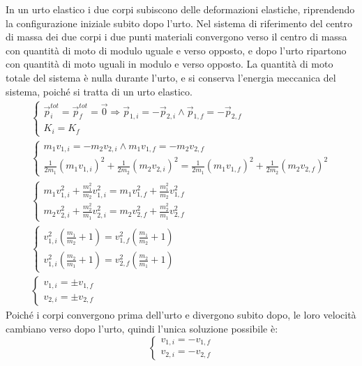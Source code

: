 \documentclass{article}
\numberwithin{equation}{subsection}
\begin{document}
In un urto elastico i due corpi subiscono delle deformazioni elastiche, riprendendo la configurazione iniziale subito dopo l'urto. 
Nel sistema di riferimento del 
centro di massa dei due corpi i due punti materiali convergono verso il centro di massa con quantità di moto di modulo uguale e verso opposto, e dopo l'urto ripartono con 
quantità di moto uguali in modulo e verso opposto. La quantità di moto 
totale del sistema è nulla durante l'urto, e si conserva l'energia meccanica del sistema, poiché si tratta di un urto elastico. 
\begin{gather*}
    \begin{cases}
        \vec{p}^{tot}_i=\vec{p}^{tot}_f=\vec{0}\Rightarrow \vec{p}_{1,i}=-\vec{p}_{2,i}\land\vec{p}_{1,f}=-\vec{p}_{2,f}\\
        K_i=K_f
    \end{cases}\\
    \begin{cases}
        m_1v_{1,i}=-m_2v_{2,i}\land m_1v_{1,f}=-m_2v_{2,f}\\
        \displaystyle\frac{1}{2m_1}(m_1v_{1,i})^2+\frac{1}{2m_2}(m_2v_{2,i})^2=\frac{1}{2m_1}(m_1v_{1,f})^2+\frac{1}{2m_2}(m_2v_{2,f})^2
    \end{cases}\\
    \begin{cases}
        \displaystyle m_1v_{1,i}^2+\frac{m_1^2}{m_2}v_{1,i}^2=m_1v_{1,f}^2+\frac{m_1^2}{m_2}v_{1,f}^2\\
        \displaystyle m_2v_{2,i}^2+\frac{m_2^2}{m_1}v_{2,i}^2=m_2v_{2,f}^2+\frac{m_2^2}{m_1}v_{2,f}^2
    \end{cases}\\
    \begin{cases}
        \displaystyle v_{1,i}^2\left(\displaystyle\frac{m_1}{m_2}+1\right)=v_{1,f}^2\left(\displaystyle\frac{m_1}{m_2}+1\right)\\
        \displaystyle v_{1,i}^2\left(\displaystyle\frac{m_2}{m_1}+1\right)=v_{2,f}^2\left(\displaystyle\frac{m_2}{m_1}+1\right)
    \end{cases}\\
    \begin{cases}
        v_{1,i}=\pm v_{1,f}\\
        v_{2,i}=\pm v_{2,f}
    \end{cases}     
\end{gather*}
Poiché i corpi convergono prima dell'urto e divergono subito 
dopo, le loro velocità cambiano verso dopo l'urto, quindi 
l'unica soluzione possibile è:
\begin{equation}
    \begin{cases}
        v_{1,i}=-v_{1,f}\\
        v_{2,i}=-v_{2,f}
    \end{cases}
\end{equation}
\end{document}
